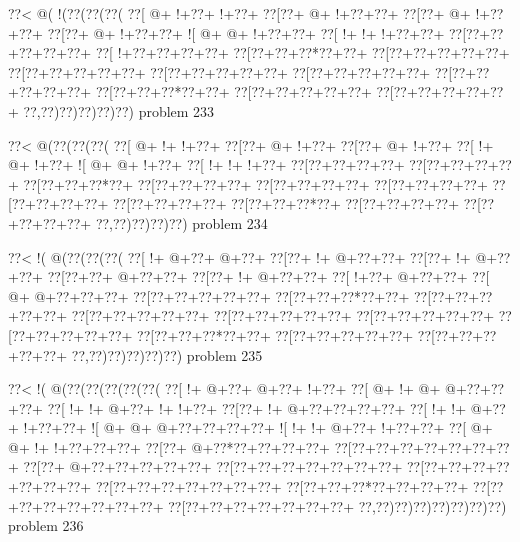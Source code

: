 \vbox{\vbox{\goo
\0??<\- @(\- !(\0??(\0??(\0??(
\0??[\- @+\- !+\0??+\- !+\0??+
\0??[\0??+\- @+\- !+\0??+\0??+
\0??[\0??+\- @+\- !+\0??+\0??+
\0??[\0??+\- @+\- !+\0??+\0??+
\- ![\- @+\- @+\- !+\0??+\0??+
\0??[\- !+\- !+\- !+\0??+\0??+
\0??[\0??+\0??+\0??+\0??+\0??+
\0??[\- !+\0??+\0??+\0??+\0??+
\0??[\0??+\0??+\0??*\0??+\0??+
\0??[\0??+\0??+\0??+\0??+\0??+
\0??[\0??+\0??+\0??+\0??+\0??+
\0??[\0??+\0??+\0??+\0??+\0??+
\0??[\0??+\0??+\0??+\0??+\0??+
\0??[\0??+\0??+\0??+\0??+\0??+
\0??[\0??+\0??+\0??*\0??+\0??+
\0??[\0??+\0??+\0??+\0??+\0??+
\0??[\0??+\0??+\0??+\0??+\0??+
\0??,\0??)\0??)\0??)\0??)\0??)
}
\hfil problem 233\hfil\break
}

\vbox{\vbox{\goo
\0??<\- @(\0??(\0??(\0??(
\0??[\- @+\- !+\- !+\0??+
\0??[\0??+\- @+\- !+\0??+
\0??[\0??+\- @+\- !+\0??+
\0??[\- !+\- @+\- !+\0??+
\- ![\- @+\- @+\- !+\0??+
\0??[\- !+\- !+\- !+\0??+
\0??[\0??+\0??+\0??+\0??+
\0??[\0??+\0??+\0??+\0??+
\0??[\0??+\0??+\0??*\0??+
\0??[\0??+\0??+\0??+\0??+
\0??[\0??+\0??+\0??+\0??+
\0??[\0??+\0??+\0??+\0??+
\0??[\0??+\0??+\0??+\0??+
\0??[\0??+\0??+\0??+\0??+
\0??[\0??+\0??+\0??*\0??+
\0??[\0??+\0??+\0??+\0??+
\0??[\0??+\0??+\0??+\0??+
\0??,\0??)\0??)\0??)\0??)
}
\hfil problem 234\hfil\break
}

\vbox{\vbox{\goo
\0??<\- !(\- @(\0??(\0??(\0??(
\0??[\- !+\- @+\0??+\- @+\0??+
\0??[\0??+\- !+\- @+\0??+\0??+
\0??[\0??+\- !+\- @+\0??+\0??+
\0??[\0??+\0??+\- @+\0??+\0??+
\0??[\0??+\- !+\- @+\0??+\0??+
\0??[\- !+\0??+\- @+\0??+\0??+
\0??[\- @+\- @+\0??+\0??+\0??+
\0??[\0??+\0??+\0??+\0??+\0??+
\0??[\0??+\0??+\0??*\0??+\0??+
\0??[\0??+\0??+\0??+\0??+\0??+
\0??[\0??+\0??+\0??+\0??+\0??+
\0??[\0??+\0??+\0??+\0??+\0??+
\0??[\0??+\0??+\0??+\0??+\0??+
\0??[\0??+\0??+\0??+\0??+\0??+
\0??[\0??+\0??+\0??*\0??+\0??+
\0??[\0??+\0??+\0??+\0??+\0??+
\0??[\0??+\0??+\0??+\0??+\0??+
\0??,\0??)\0??)\0??)\0??)\0??)
}
\hfil problem 235\hfil\break
}

\vbox{\vbox{\goo
\0??<\- !(\- @(\0??(\0??(\0??(\0??(\0??(
\0??[\- !+\- @+\0??+\- @+\0??+\- !+\0??+
\0??[\- @+\- !+\- @+\- @+\0??+\0??+\0??+
\0??[\- !+\- !+\- @+\0??+\- !+\- !+\0??+
\0??[\0??+\- !+\- @+\0??+\0??+\0??+\0??+
\0??[\- !+\- !+\- @+\0??+\- !+\0??+\0??+
\- ![\- @+\- @+\- @+\0??+\0??+\0??+\0??+
\- ![\- !+\- !+\- @+\0??+\- !+\0??+\0??+
\0??[\- @+\- @+\- !+\- !+\0??+\0??+\0??+
\0??[\0??+\- @+\0??*\0??+\0??+\0??+\0??+
\0??[\0??+\0??+\0??+\0??+\0??+\0??+\0??+
\0??[\0??+\- @+\0??+\0??+\0??+\0??+\0??+
\0??[\0??+\0??+\0??+\0??+\0??+\0??+\0??+
\0??[\0??+\0??+\0??+\0??+\0??+\0??+\0??+
\0??[\0??+\0??+\0??+\0??+\0??+\0??+\0??+
\0??[\0??+\0??+\0??*\0??+\0??+\0??+\0??+
\0??[\0??+\0??+\0??+\0??+\0??+\0??+\0??+
\0??[\0??+\0??+\0??+\0??+\0??+\0??+\0??+
\0??,\0??)\0??)\0??)\0??)\0??)\0??)\0??)
}
\hfil problem 236\hfil\break
}

